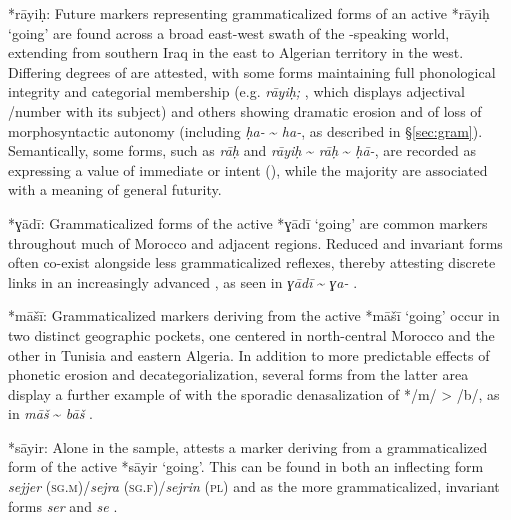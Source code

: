 \documentclass[output=paper]{langsci/langscibook}
\begin{document}
\begin{altdescription}
\item[*{rāyiḥ}:]
Future markers representing grammaticalized forms of an active  *{rāyiḥ} ‘going’ are found across a broad east-west swath of the -speaking world, extending from southern Iraq in the east to Algerian territory in the west. Differing degrees of  are attested, with some forms maintaining full phonological integrity and categorial membership (e.g.  \textit{rāyiḥ;} \citealt{Mahdi1985}, which displays adjectival /number  with its subject) and others showing dramatic erosion and of loss of morphosyntactic autonomy (including  \textit{ḥa-} {\textasciitilde} \textit{ha-}, as described in §\ref{sec:gram}). Semantically, some forms, such as  \textit{rāḥ} and  \textit{rāyiḥ} {\textasciitilde} \textit{rāḥ} {\textasciitilde} \textit{ḥā-}, are recorded as expressing a value of immediate  or  intent (\citealt{Boucherit2011,Rosenhouse2011}), while the majority are associated with a meaning of general futurity.

\item[*{ɣādī}:]
Grammaticalized forms of the active  *{ɣādī} ‘going’ are common  markers throughout much of Morocco and adjacent regions. Reduced and invariant forms often co-exist alongside less grammaticalized reflexes, thereby attesting discrete links in an increasingly advanced , as seen in  \textit{ɣādī} {\textasciitilde} \textit{ɣa-} \citep{Caubet2011}.

\item[*{māšī}:]
Grammaticalized  markers deriving from the active  *{māšī} ‘going’ occur in two distinct geographic pockets, one centered in north-central Morocco and the other in Tunisia and eastern Algeria. In addition to more predictable effects of phonetic erosion and decategorialization, several forms from the latter area display a further example of  with the sporadic denasalization of */m/ > /b/, as in  \textit{māš} {\textasciitilde} \textit{bāš} \citep{Talmoudi1980}.

\item[*{sāyir}:]
Alone in the sample,  attests a  marker deriving from a grammaticalized form of the active  *{sāyir} ‘going’. This can be found in both an inflecting form \textit{sejjer} (\textsc{sg.m})/\textit{sejra} (\textsc{sg.f})/\textit{sejrin} (\textsc{pl}) and as the more grammaticalized, invariant forms \textit{ser} and \textit{se} \citep{Vanhove1993}.
\end{altdescription}
\end{document}
